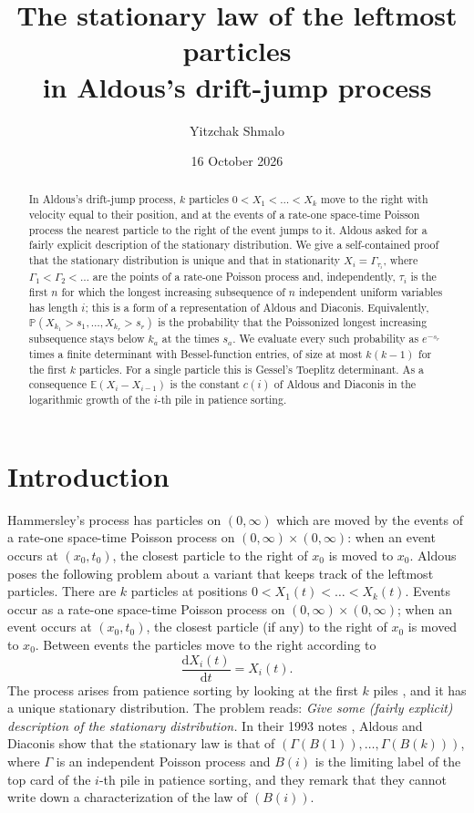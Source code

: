\documentclass[11pt]{amsart}
\title[The leftmost particles of a drift-jump process]{The stationary law of the leftmost particles\\ in Aldous's drift-jump process}
\author{Yitzchak Shmalo}
\date{16 October 2026}
\theoremstyle{remark}
\numberwithin{equation}{section}
\newcommand{\E}{\mathbb E}
\newcommand{\Pp}{\mathbb P}
\begin{document}
\begin{abstract}
In Aldous's drift-jump process, $k$ particles $0<X_1<\dots<X_k$ move to the right with velocity equal to their position, and at the events of a rate-one space-time Poisson process the nearest particle to the right of the event jumps to it. Aldous asked for a fairly explicit description of the stationary distribution. We give a self-contained proof that the stationary distribution is unique and that in stationarity $X_i=\Gamma_{\tau_i}$, where $\Gamma_1<\Gamma_2<\dots$ are the points of a rate-one Poisson process and, independently, $\tau_i$ is the first $n$ for which the longest increasing subsequence of $n$ independent uniform variables has length $i$; this is a form of a representation of Aldous and Diaconis. Equivalently, $\Pp(X_{k_1}>s_1,\dots,X_{k_r}>s_r)$ is the probability that the Poissonized longest increasing subsequence stays below $k_a$ at the times $s_a$. We evaluate every such probability as $e^{-s_r}$ times a finite determinant with Bessel-function entries, of size at most $k(k-1)$ for the first $k$ particles. For a single particle this is Gessel's Toeplitz determinant. As a consequence $\E(X_i-X_{i-1})$ is the constant $c(i)$ of Aldous and Diaconis in the logarithmic growth of the $i$-th pile in patience sorting.
\end{abstract}
\maketitle

\section{Introduction}\label{sec:intro}

Hammersley's process \cite{Ham72,AD95,CG05} has particles on $(0,\infty)$ which are moved by the events of a rate-one space-time Poisson process on $(0,\infty)\times(0,\infty)$: when an event occurs at $(x_0,t_0)$, the closest particle to the right of $x_0$ is moved to $x_0$. Aldous \cite{Ald18} poses the following problem about a variant that keeps track of the leftmost particles. There are $k$ particles at positions $0<X_1(t)<\dots<X_k(t)$. Events occur as a rate-one space-time Poisson process on $(0,\infty)\times(0,\infty)$; when an event occurs at $(x_0,t_0)$, the closest particle (if any) to the right of $x_0$ is moved to $x_0$. Between events the particles move to the right according to
\[
\frac{\mathrm dX_i(t)}{\mathrm dt}=X_i(t).
\]
The process arises from patience sorting by looking at the first $k$ piles \cite[Section~5.2]{AD99}, and it has a unique stationary distribution. The problem \cite{Ald18} reads: \emph{Give some (fairly explicit) description of the stationary distribution.} In their 1993 notes \cite[Section~4.1]{AD93}, Aldous and Diaconis show that the stationary law is that of $(\Gamma(B(1)),\dots,\Gamma(B(k)))$, where $\Gamma$ is an independent Poisson process and $B(i)$ is the limiting label of the top card of the $i$-th pile in patience sorting, and they remark that they cannot write down a characterization of the law of $(B(i))$.
\end{document}
